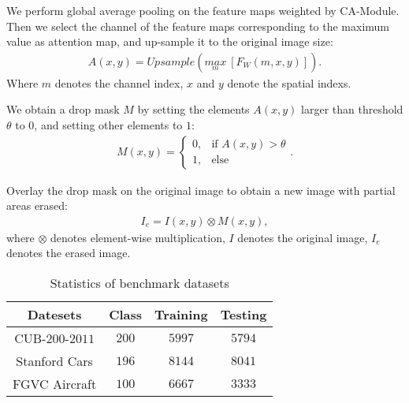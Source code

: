 \documentclass[conference]{IEEEtran}
\begin{document}
We perform global average pooling on the feature maps weighted by CA-Module. Then we select the channel of the feature maps corresponding to the maximum value as attention map, and up-sample it to the original image size:
\begin{eqnarray}
A(x,y) = Upsample(\underset{m}{max} \ [F_{W}(m,x,y)]).
\end{eqnarray}
Where $m$ denotes the channel index, $x$ and $y$ denote the spatial indexs.

We obtain a drop mask $M$ by setting the elements $A(x,y)$ larger than threshold $\theta$ to $0$, and setting other elements to $1$:
\begin{eqnarray}
M(x,y) = \begin{cases} 0, & \mbox{if }A(x,y)>\theta \\ 1, & \mbox{else } \end{cases}.
\end{eqnarray}

Overlay the drop mask on the original image to obtain a new image with partial areas erased:
\begin{eqnarray}
I_{e}=I(x,y)\otimes M(x,y),
\end{eqnarray}
where $\otimes$ denotes element-wise multiplication, $I$ denotes the original image, $I_{e}$ denotes the erased image.
\begin{table}
\vspace{-2mm}
\begin{center}
\caption{Statistics of benchmark datasets} \label{tab:datasets}
\begin{tabular}{c|c|c|c}
  \hline
  Datesets & Class & Training & Testing  \\
  \hline
  \hline
  CUB-$200$-$2011$ & $200$ & $5997$ & $5794$ \\
Stanford Cars & $196$ & $8144$ & $8041$ \\
FGVC Aircraft & $100$ & $6667$ & $3333$  \\
  \hline
\end{tabular}
\end{center}
\vspace{-3mm}
\end{table}
\end{document}
